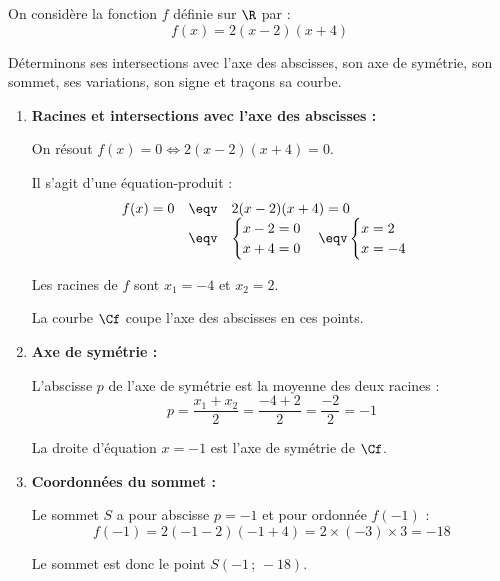 \begin{methode}
	On considère la fonction $f$ définie sur $\R$ par :
	\[
		f(x) = 2(x-2)(x+4)
	\]

	Déterminons ses intersections avec l'axe des abscisses, son axe de symétrie, son sommet, ses variations, son signe et traçons sa courbe.

	\newpage

	\begin{correction}
		\nline
		\begin{enumerate}
			\item \textbf{Racines et intersections avec l'axe des abscisses :}

			      On résout $f(x) = 0 \iff 2(x-2)(x+4) = 0$.

			      Il s'agit d'une équation-produit :
			      \[
				      \begin{array}{rcl}
					      f(x) = 0 & \eqv & 2(x-2)(x+4) = 0                                                                      \\
					               & \eqv & \begin{cases}x-2 = 0\\ x+4 = 0\end{cases} \eqv \begin{cases}x = 2\\x = -4\end{cases}
				      \end{array}
			      \]

			      Les racines de $f$ sont $x_1 = -4$ et $x_2 = 2$.

			      La courbe $\Cf$ coupe l'axe des abscisses en ces points.

			\item \textbf{Axe de symétrie :}

			      L'abscisse $p$ de l'axe de symétrie est la moyenne des deux racines :
			      \[
				      p = \dfrac{x_1 + x_2}{2} = \dfrac{-4 + 2}{2} = \dfrac{-2}{2} = -1
			      \]

			      La droite d'équation $x = -1$ est l'axe de symétrie de $\Cf$.

			\item \textbf{Coordonnées du sommet :}

			      Le sommet $S$ a pour abscisse $p = -1$ et pour ordonnée $f(-1)$ :
			      \[
				      f(-1) = 2(-1-2)(-1+4) = 2 \times (-3) \times 3 = -18
			      \]

			      Le sommet est donc le point $S(-1\,;\,-18)$.


\end{enumerate}
\end{correction}
\end{methode}
